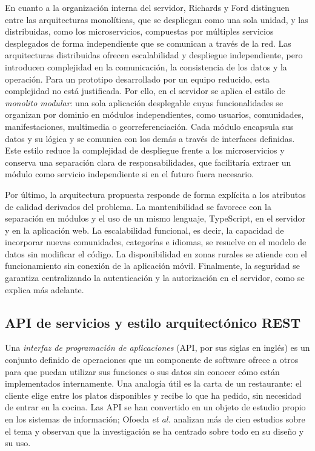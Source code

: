 En cuanto a la organización interna del servidor, Richards y Ford \cite{richards2020fundamentals} distinguen entre las arquitecturas monolíticas, que se despliegan como una sola unidad, y las distribuidas, como los microservicios, compuestas por múltiples servicios desplegados de forma independiente que se comunican a través de la red. Las arquitecturas distribuidas ofrecen escalabilidad y despliegue independiente, pero introducen complejidad en la comunicación, la consistencia de los datos y la operación. Para un prototipo desarrollado por un equipo reducido, esta complejidad no está justificada. Por ello, en el servidor se aplica el estilo de \textit{monolito modular}: una sola aplicación desplegable cuyas funcionalidades se organizan por dominio en módulos independientes, como usuarios, comunidades, manifestaciones, multimedia o georreferenciación. Cada módulo encapsula sus datos y su lógica y se comunica con los demás a través de interfaces definidas. Este estilo reduce la complejidad de despliegue frente a los microservicios y conserva una separación clara de responsabilidades, que facilitaría extraer un módulo como servicio independiente si en el futuro fuera necesario.

Por último, la arquitectura propuesta responde de forma explícita a los atributos de calidad derivados del problema. La mantenibilidad se favorece con la separación en módulos y el uso de un mismo lenguaje, TypeScript, en el servidor y en la aplicación web. La escalabilidad funcional, es decir, la capacidad de incorporar nuevas comunidades, categorías e idiomas, se resuelve en el modelo de datos sin modificar el código. La disponibilidad en zonas rurales se atiende con el funcionamiento sin conexión de la aplicación móvil. Finalmente, la seguridad se garantiza centralizando la autenticación y la autorización en el servidor, como se explica más adelante.

\subsection{API de servicios y estilo arquitectónico REST}
Una \textit{interfaz de programación de aplicaciones} (API, por sus siglas en inglés) es un conjunto definido de operaciones que un componente de software ofrece a otros para que puedan utilizar sus funciones o sus datos sin conocer cómo están implementados internamente. Una analogía útil es la carta de un restaurante: el cliente elige entre los platos disponibles y recibe lo que ha pedido, sin necesidad de entrar en la cocina. Las API se han convertido en un objeto de estudio propio en los sistemas de información; Ofoeda \textit{et al.} \cite{ofoeda2019api} analizan más de cien estudios sobre el tema y observan que la investigación se ha centrado sobre todo en su diseño y su uso.


